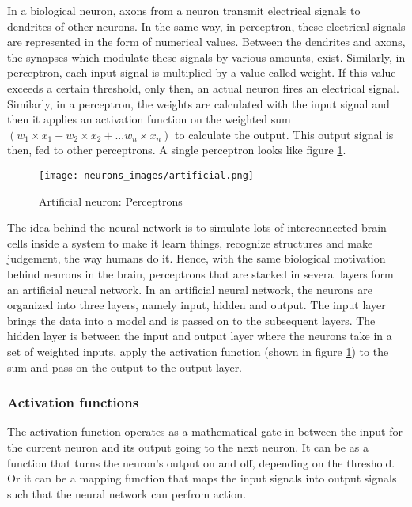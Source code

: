 \par

In a biological neuron, axons from a neuron transmit electrical signals to dendrites of other neurons. In the same way, in perceptron, these electrical signals are represented in the form of numerical values. Between the dendrites and axons, the synapses which modulate these signals by various amounts, exist. Similarly, in perceptron, each input signal is multiplied by a value called weight. If this value exceeds a certain threshold, only then, an actual neuron fires an electrical signal. Similarly, in a perceptron, the weights are calculated with the input signal and then it applies an activation function on the weighted sum $(w_1 \times x_1 + w_2 \times x_2+...w_n \times x_n)$ to calculate the output. This output signal is then, fed to other perceptrons. A single perceptron looks like figure \ref{Perceptron}.  

\begin{figure}[h!]
    \centering
    \texttt{[image: neurons\_images/artificial.png]}
    \caption{Artificial neuron: Perceptrons \cite{Perceptrons}}
    \label{Perceptron}
\end{figure}

\par

The idea behind the neural network is to simulate lots of interconnected brain cells inside a system to make it learn things, recognize structures and make judgement, the way humans do it. Hence, with the same biological motivation behind neurons in the brain, perceptrons that are stacked in several layers form an artificial neural network. In an artificial neural network, the neurons are organized into three layers, namely input, hidden and output. The input layer brings the data into a model and is passed on to the subsequent layers. The hidden layer is between the input and output layer where the neurons take in a set of weighted inputs, apply the activation function (shown in figure \ref{Perceptron}) to the sum and pass on the output to the output layer. 

\subsubsection{Activation functions} \label{activation_functions}

The activation function operates as a mathematical gate in between the input for the current neuron and its output going to the next neuron. It can be as a function that turns the neuron's output on and off, depending on the threshold. Or it can be a mapping function that maps the input signals into output signals such that the neural network can perfrom action. 


